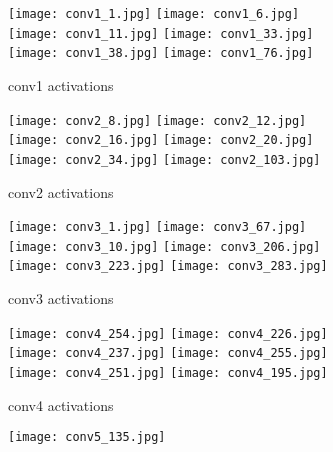 \documentclass[runningheads]{llncs}
\begin{document}
\begin{figure}[t!]
\begin{center}
\begin{subfigure}{0.49\textwidth}
\texttt{[image: conv1\_1.jpg]}
\texttt{[image: conv1\_6.jpg]}
\texttt{[image: conv1\_11.jpg]}
\texttt{[image: conv1\_33.jpg]}
\texttt{[image: conv1\_38.jpg]}
\texttt{[image: conv1\_76.jpg]}
\caption{conv1 activations}
\end{subfigure}
\begin{subfigure}{0.49\textwidth}
\texttt{[image: conv2\_8.jpg]}
\texttt{[image: conv2\_12.jpg]}
\texttt{[image: conv2\_16.jpg]}
\texttt{[image: conv2\_20.jpg]}
\texttt{[image: conv2\_34.jpg]}
\texttt{[image: conv2\_103.jpg]}
\caption{conv2 activations}
\end{subfigure}\vspace{1mm}
\begin{subfigure}{0.49\textwidth}
\texttt{[image: conv3\_1.jpg]}
\texttt{[image: conv3\_67.jpg]}
\texttt{[image: conv3\_10.jpg]}
\texttt{[image: conv3\_206.jpg]}
\texttt{[image: conv3\_223.jpg]}
\texttt{[image: conv3\_283.jpg]}
\caption{conv3 activations}
\end{subfigure}
\begin{subfigure}{0.49\textwidth}
\texttt{[image: conv4\_254.jpg]}
\texttt{[image: conv4\_226.jpg]}
\texttt{[image: conv4\_237.jpg]}
\texttt{[image: conv4\_255.jpg]}
\texttt{[image: conv4\_251.jpg]}
\texttt{[image: conv4\_195.jpg]}
\caption{conv4 activations}
\end{subfigure}\vspace{1mm}
\begin{subfigure}{0.49\textwidth}
\texttt{[image: conv5\_135.jpg]}

\end{subfigure}
\end{center}
\end{figure}
\end{document}
